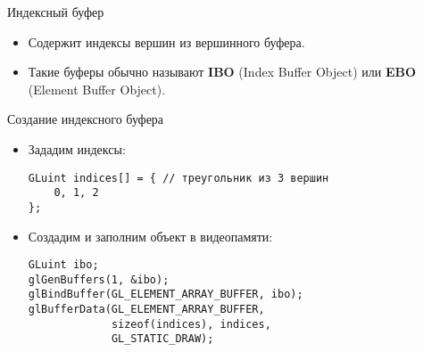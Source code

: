 \documentclass{beamer}
\begin{document}

\begin{frame}[fragile]{Индексный буфер}
    \begin{itemize}
        \item Содержит индексы вершин из вершинного буфера.
        \item Такие буферы обычно называют {\bf IBO} (Index Buffer Object) 
            или {\bf EBO} (Element Buffer Object).
    \end{itemize}
\end{frame}

\begin{frame}[fragile]{Создание индексного буфера}
    \begin{itemize}
        \item Зададим индексы:
            {\small \begin{lstlisting}
GLuint indices[] = { // треугольник из 3 вершин
    0, 1, 2
};
            \end{lstlisting}}
        \item Создадим и заполним объект в видеопамяти:
            {\small \begin{lstlisting}
GLuint ibo;
glGenBuffers(1, &ibo);
glBindBuffer(GL_ELEMENT_ARRAY_BUFFER, ibo);
glBufferData(GL_ELEMENT_ARRAY_BUFFER,
             sizeof(indices), indices,
             GL_STATIC_DRAW);
            \end{lstlisting}}
    \end{itemize}
\end{frame}
\end{document}
